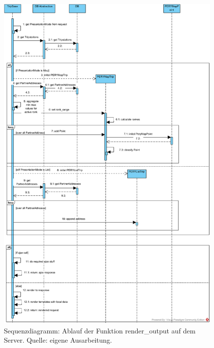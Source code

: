 \documentclass[Bachelorarbeit.tex]{subfiles}
\begin{document}
\begin{figure}[h]
\centering
\includegraphics[width=1\linewidth]{img/Implementierung/renderOutput}
\caption[Sequenzdiagramm: Ablauf der Funktion render\_output]{Sequenzdiagramm: Ablauf der Funktion render\_output auf dem Server. Quelle: eigene Ausarbeitung.}
\label{fig:renderOutput}
\end{figure}
\end{document}
